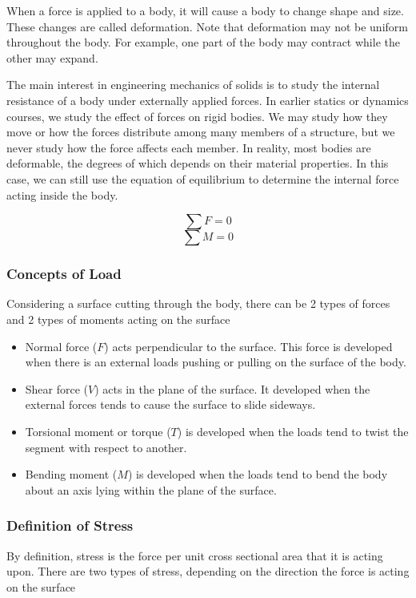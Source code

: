 \documentclass[a4paper,openany,nobib]{tufte-book}
\begin{document}
When a force is applied to a body, it will cause a body to change shape
and size. These changes are called deformation. Note that deformation
may not be uniform throughout the body. For example, one part of the
body may contract while the other may expand.

The main interest in engineering mechanics of solids is to study the
internal resistance of a body under externally applied forces. In
earlier statics or dynamics courses, we study the effect of forces on
rigid bodies. We may study how they move or how the forces distribute
among many members of a structure, but we never study how the force
affects each member. In reality, most bodies are deformable, the degrees
of which depends on their material properties. In this case, we can
still use the equation of equilibrium to determine the internal force
acting inside the body.

$$\sum F = 0$$ $$\sum M = 0$$

\subsubsection{Concepts of Load}
\label{concepts-of-load}
Considering a surface cutting through the body, there can be 2 types of
forces and 2 types of moments acting on the surface

\begin{itemize}
\item Normal force (\(F\)) acts perpendicular to the surface. This force is
developed when there is an external loads pushing or pulling on the
surface of the body.

\item Shear force (\(V\)) acts in the plane of the surface. It developed when
the external forces tends to cause the surface to slide sideways.

\item Torsional moment or torque (\(T\)) is developed when the loads tend to
twist the segment with respect to another.

\item Bending moment (\(M\)) is developed when the loads tend to bend the body
about an axis lying within the plane of the surface.
\end{itemize}

\subsubsection{Definition of Stress}
\label{definition-of-stress}
By definition, stress is the force per unit cross sectional area that it
is acting upon. There are two types of stress, depending on the
direction the force is acting on the surface
\end{document}
